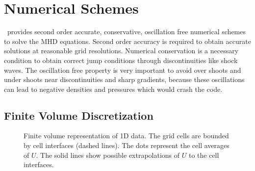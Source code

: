 %

\section{Numerical Schemes \label{section:numerical_schemes}}

\BATSRUS\ provides second order accurate, conservative, oscillation free
numerical schemes to solve the MHD equations. Second order accuracy
is required to obtain accurate solutions at reasonable grid resolutions.
Numerical conservation is a necessary condition to obtain correct 
jump conditions through discontinuities like shock waves. 
The oscillation free property is very important to avoid over shoots
and under shoots near discontinuities and sharp gradients, because
these oscillations can lead to negative densities and pressures which
would crash the code.

\subsection{Finite Volume Discretization \label{section:finite_volume}}

\begin{figure}
   \centerline{}
   \caption{Finite volume representation of 1D data. The grid cells are
            bounded by cell interfaces (dashed lines).
            The dots represent the cell averages of $U$.
            The solid lines show possible extrapolations of $U$ to the
            cell interfaces.}
\label{fig:fivol}
\end{figure}

